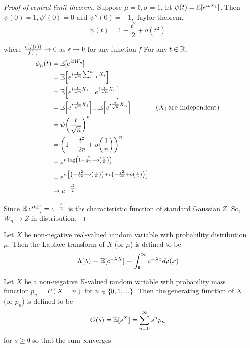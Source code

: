 \documentclass{report}
\begin{document}
\begin{proof}[Proof of central limit theorem]
    Suppose $\mu = 0, \sigma = 1$, let $\psi(t) = \mathbb{E}[e^{it X_1}]$. Then $\psi(0) = 1, \psi'(0) = 0$ and $\psi''(0) = -1$, Taylor theorem,
    $$
        \psi(t) = 1 - \frac{t^2}{2} + o(t^2)
    $$
    
    where $\frac{o(f(\epsilon))}{f(\epsilon)} \to 0$ as $\epsilon \to 0$ for any function $f$
    For any $t \in \mathbb{R}$,
    \begin{align*}
        \phi_n(t)
        &= \Exp[e^{it W_n}] \\
        &= \Exp\bracket*{e^{i \frac{t}{\sqrt{n}} \sum_{i=1}^n X_i}} \\
        &= \Exp\bracket*{e^{i \frac{t}{\sqrt{n}} X_1} ... e^{i \frac{t}{\sqrt{n}} X_n}} \\
        &= \Exp\bracket*{e^{i \frac{t}{\sqrt{n}} X_1}} ... \Exp\bracket*{e^{i \frac{t}{\sqrt{n}} X_n}} &\text{($X_i$ are independent)} \\
        &= \psi \tuple*{\frac{t}{\sqrt{n}}}^n \\
        &= \tuple*{1 - \frac{t^2}{2n} + o \tuple*{\frac{1}{n}}}^n \\
        &= e^{n \log \tuple*{1 - \frac{t^2}{2n} + o \tuple*{\frac{1}{n}}}} \\
        &= e^{n \bracket*{ \tuple*{- \frac{t^2}{2n} + o \tuple*{\frac{1}{n}}} + o\tuple*{- \frac{t^2}{2n} + o \tuple*{\frac{1}{n}}}} } \\
        &\to e^{- \frac{t^2}{2}}
    \end{align*}

	Since $\mathbb{E}[e^{it Z}] = e^{- \frac{t^2}{2}}$ is the characteristic function of standard Gaussian $Z$. So, $W_n \to Z$ in distribution.
\end{proof}

\begin{definition}
    Let $X$ be non-negative real-valued random variable with probability distribution $\mu$. Then the Laplace transform of $X$ (or $\mu$) is defined to be
    $$
        \Lambda(\lambda) = \mathbb{E}[e^{-\lambda X}] = \int_0^\infty e^{-\lambda x} d \mu(x)
    $$
\end{definition}

\begin{definition}
    Let $X$ be a non-negative $\mathbb{N}$-valued random variable with probability mass function $p_n = P(X = n)$ for $n \in \{0, 1, ...\}$. Then the generating function of $X$ (or $p_n$) is defined to be
    $$
        G(s) = \mathbb{E}[s^X] = \sum_{n=0}^\infty s^n p_n
    $$
    for $s \geq 0$ so that the sum converges
\end{definition}
\end{document}
